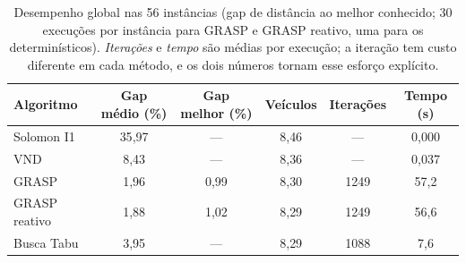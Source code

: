 \begin{table}[H]
\centering
\caption{Desempenho global nas 56 instâncias (gap de distância ao melhor conhecido; 30 execuções por instância para GRASP e GRASP reativo, uma para os determinísticos). \emph{Iterações} e \emph{tempo} são médias por execução; a iteração tem custo diferente em cada método, e os dois números tornam esse esforço explícito.}\label{tab:overall}
\small\setlength{\tabcolsep}{4pt}
\begin{tabular}{lccccc}
\toprule
\textbf{Algoritmo} & \textbf{Gap médio (\%)} & \textbf{Gap melhor (\%)} & \textbf{Veículos} & \textbf{Iterações} & \textbf{Tempo (s)} \\
\midrule
Solomon I1 & 35{,}97 & --- & 8{,}46 & --- & 0{,}000 \\
VND & 8{,}43 & --- & 8{,}36 & --- & 0{,}037 \\
GRASP & 1{,}96 & 0{,}99 & 8{,}30 & 1249 & 57{,}2 \\
GRASP reativo & 1{,}88 & 1{,}02 & 8{,}29 & 1249 & 56{,}6 \\
Busca Tabu & 3{,}95 & --- & 8{,}29 & 1088 & 7{,}6 \\
\bottomrule
\end{tabular}
\end{table}
